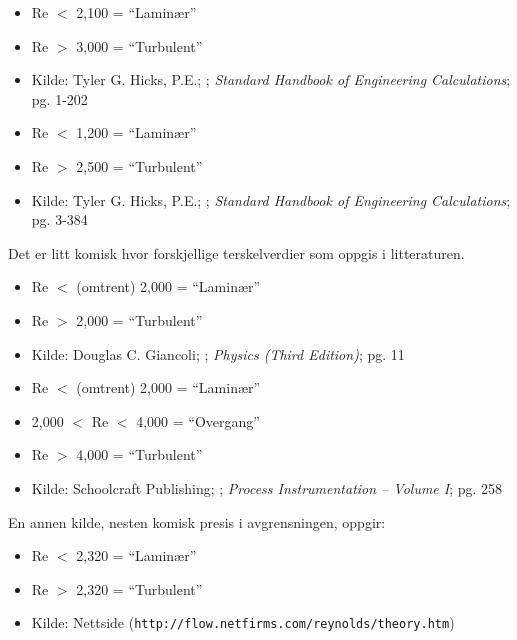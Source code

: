 \begin{itemize}
\goodbreak
\item{} Re $<$ 2,100 = ``Laminær''
\item{} Re $>$ 3,000 = ``Turbulent''
\item{} Kilde: Tyler G. Hicks, P.E.; ; {\it Standard Handbook of Engineering Calculations}; pg. 1-202
\end{itemize}

\begin{itemize}
\goodbreak
\item{} Re $<$ 1,200 = ``Laminær''
\item{} Re $>$ 2,500 = ``Turbulent''
\item{} Kilde: Tyler G. Hicks, P.E.; ; {\it Standard Handbook of Engineering Calculations}; pg. 3-384
\end{itemize}

Det er litt komisk hvor forskjellige terskelverdier som oppgis i litteraturen.

\begin{itemize}
\goodbreak
\item{} Re $<$ (omtrent) 2,000 = ``Laminær''
\item{} Re $>$ 2,000 = ``Turbulent''
\item{} Kilde: Douglas C. Giancoli; ; {\it Physics (Third Edition)}; pg. 11
\end{itemize}

\begin{itemize}
\goodbreak
\item{} Re $<$ (omtrent) 2,000 = ``Laminær''
\item{} 2,000 $<$ Re $<$ 4,000 = ``Overgang''
\item{} Re $>$ 4,000 = ``Turbulent''
\item{} Kilde: Schoolcraft Publishing; ; {\it Process Instrumentation -- Volume I}; pg. 258
\end{itemize}

\goodbreak

En annen kilde, nesten komisk presis i avgrensningen, oppgir:

\begin{itemize}
\item{} Re $<$ 2,320 = ``Laminær''
\item{} Re $>$ 2,320 = ``Turbulent''
\item{} Kilde: Nettside ({\tt http://flow.netfirms.com/reynolds/theory.htm})
\end{itemize}

